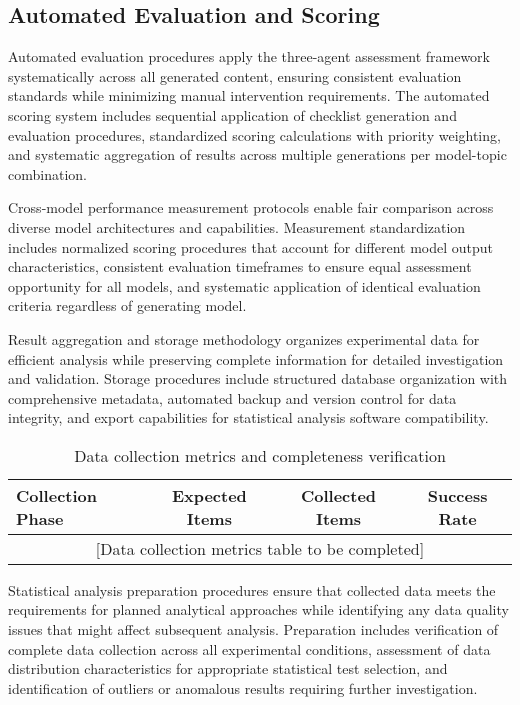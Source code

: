 \subsection{Automated Evaluation and Scoring}

Automated evaluation procedures apply the three-agent assessment framework systematically across all generated content, ensuring consistent evaluation standards while minimizing manual intervention requirements. The automated scoring system includes sequential application of checklist generation and evaluation procedures, standardized scoring calculations with priority weighting, and systematic aggregation of results across multiple generations per model-topic combination.

Cross-model performance measurement protocols enable fair comparison across diverse model architectures and capabilities. Measurement standardization includes normalized scoring procedures that account for different model output characteristics, consistent evaluation timeframes to ensure equal assessment opportunity for all models, and systematic application of identical evaluation criteria regardless of generating model.

Result aggregation and storage methodology organizes experimental data for efficient analysis while preserving complete information for detailed investigation and validation. Storage procedures include structured database organization with comprehensive metadata, automated backup and version control for data integrity, and export capabilities for statistical analysis software compatibility.

\begin{table}[htbp]
    \centering
    \caption{Data collection metrics and completeness verification}
    \label{tab:data-collection-metrics}
    \begin{tabular}{|l|c|c|c|}
    \hline
    \textbf{Collection Phase} & \textbf{Expected Items} & \textbf{Collected Items} & \textbf{Success Rate} \\
    \hline
    \multicolumn{4}{|c|}{[Data collection metrics table to be completed]} \\
    \hline
    \end{tabular}
\end{table}

Statistical analysis preparation procedures ensure that collected data meets the requirements for planned analytical approaches while identifying any data quality issues that might affect subsequent analysis. Preparation includes verification of complete data collection across all experimental conditions, assessment of data distribution characteristics for appropriate statistical test selection, and identification of outliers or anomalous results requiring further investigation.

